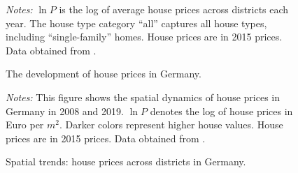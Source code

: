 \documentclass[
  12pt,
]{article}
\begin{document}
\begin{figure}


\caption{\label{fig-price-growth}The development of house prices in
Germany.}
\begin{minipage}{0.975\textwidth}
\small
\emph{Notes:} \(\ln P\) is the log
of average house prices across districts each year. The house type
category ``all'' captures all house types, including ``single-family''
homes. House prices are in 2015 prices. Data obtained from
\citet{rwi_redhk_2020}.
\end{minipage}


\end{figure}%

\begin{figure}


\caption{\label{fig-spatial-pattern}Spatial trends: house prices across
districts in Germany.}
\begin{minipage}{0.975\textwidth}
\small
\emph{Notes:} This
figure shows the spatial dynamics of house prices in Germany in 2008 and
2019. \(\ln P\) denotes the log of house prices in Euro per \(m^2\).
Darker colors represent higher house values. House prices are in 2015
prices. Data obtained from
\citet{rwi_redhk_2020}.
\end{minipage}


\end{figure}%
\end{document}
